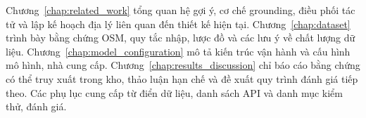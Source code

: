Chương~\ref{chap:related_work} tổng quan hệ gợi ý, cơ chế grounding, điều phối tác tử và lập kế hoạch địa lý liên quan đến thiết kế hiện tại. Chương~\ref{chap:dataset} trình bày bằng chứng OSM, quy tắc nhập, lược đồ và các lưu ý về chất lượng dữ liệu. Chương~\ref{chap:model_configuration} mô tả kiến trúc vận hành và cấu hình mô hình, nhà cung cấp. Chương~\ref{chap:results_discussion} chỉ báo cáo bằng chứng có thể truy xuất trong kho, thảo luận hạn chế và đề xuất quy trình đánh giá tiếp theo. Các phụ lục cung cấp từ điển dữ liệu, danh sách API và danh mục kiểm thử, đánh giá.
